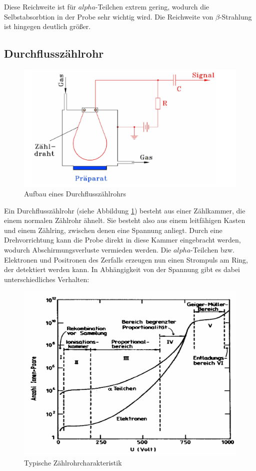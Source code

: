 Diese Reichweite ist für $alpha$-Teilchen extrem gering, wodurch die Selbstabsorbtion in der Probe sehr wichtig wird. Die Reichweite von $\beta$-Strahlung ist hingegen deutlich größer.  


\subsection{Durchflusszählrohr}
\begin{figure}[H]
 \centering \includegraphics[width=0.9\linewidth]{Bilder/zaehlrohr.png}
 \caption{Aufbau eines Durchflusszählrohrs}
 \label{durchflusszaehlrohr}
\end{figure}
Ein Durchflusszählrohr (siehe Abbildung \ref{durchflusszaehlrohr}) besteht aus einer Zählkammer, die einem normalen Zählrohr ähnelt. Sie besteht also aus einem leitfähigen Kasten und einem Zählring, zwischen denen eine Spannung anliegt. Durch eine Drehvorrichtung kann die Probe direkt in diese Kammer eingebracht werden, wodurch Abschirmungsverluste vermieden werden. Die $alpha$-Teilchen bzw. Elektronen und Positronen des Zerfalls erzeugen nun einen Strompuls am Ring, der detektiert werden kann. In Abhängigkeit von der Spannung gibt es dabei unterschiedliches Verhalten:
\begin{figure}[H]
 \centering \includegraphics[width=0.9\linewidth]{Bilder/zaehlrohrcharakteristik.png}
 \caption{Typische Zählrohrcharakteristik}
\end{figure}
